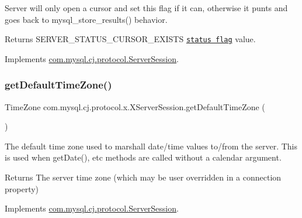 Server will only open a cursor and set this flag if it can, otherwise it punts and goes back to mysql\+\_\+store\+\_\+results() behavior.

\begin{DoxyReturn}{Returns}
S\+E\+R\+V\+E\+R\+\_\+\+S\+T\+A\+T\+U\+S\+\_\+\+C\+U\+R\+S\+O\+R\+\_\+\+E\+X\+I\+S\+TS \href{http://dev.mysql.com/doc/internals/en/status-flags.html}{\tt status flag} value. 
\end{DoxyReturn}


Implements \mbox{\hyperlink{interfacecom_1_1mysql_1_1cj_1_1protocol_1_1_server_session_aee37dfcad7c37e0b031da85b7f638435}{com.\+mysql.\+cj.\+protocol.\+Server\+Session}}.

\mbox{\label{classcom_1_1mysql_1_1cj_1_1protocol_1_1x_1_1_x_server_session_aacde6eddcc1fd40cc726095f2f2d6b44}} 
\subsubsection{\texorpdfstring{get\+Default\+Time\+Zone()}{getDefaultTimeZone()}}
{\footnotesize\ttfamily Time\+Zone com.\+mysql.\+cj.\+protocol.\+x.\+X\+Server\+Session.\+get\+Default\+Time\+Zone (\begin{DoxyParamCaption}{ }\end{DoxyParamCaption})}

The default time zone used to marshall date/time values to/from the server. This is used when get\+Date(), etc methods are called without a calendar argument.

\begin{DoxyReturn}{Returns}
The server time zone (which may be user overridden in a connection property) 
\end{DoxyReturn}


Implements \mbox{\hyperlink{interfacecom_1_1mysql_1_1cj_1_1protocol_1_1_server_session_a080efb1043278f9c6d13f7dc24d18476}{com.\+mysql.\+cj.\+protocol.\+Server\+Session}}.

\mbox{\label{classcom_1_1mysql_1_1cj_1_1protocol_1_1x_1_1_x_server_session_a3184e5a4acad8af656fb72a6b57a5fa8}} 
